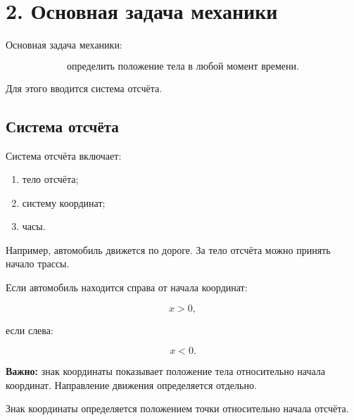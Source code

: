 \documentclass[a4paper,12pt]{article}
\begin{document}
\section*{2. Основная задача механики}

Основная задача механики:

\[
\text{определить положение тела в любой момент времени.}
\]

Для этого вводится система отсчёта.

\subsection*{Система отсчёта}

Система отсчёта включает:

\begin{enumerate}
    \item тело отсчёта;
    \item систему координат;
    \item часы.
\end{enumerate}

Например, автомобиль движется по дороге.
За тело отсчёта можно принять начало трассы.

Если автомобиль находится справа от начала координат:

\[
x>0,
\]

если слева:

\[
x<0.
\]

\textbf{Важно:} знак координаты показывает положение тела
относительно начала координат.
Направление движения определяется отдельно.

\begin{center}

{\small
Знак координаты определяется положением точки относительно начала отсчёта.
}
\end{center}
\end{document}
